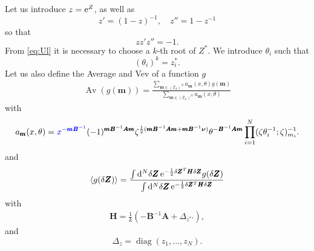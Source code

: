 \documentclass[a4paper,11pt]{article}	%
\DeclareMathOperator{\diag}{diag}
\newcommand{\bs}[1]{\boldsymbol{#1}}
\def\IZ{\mathbb{Z}}
\def\vev#1{\left\langle #1 \right\rangle}
\newcommand{\re}{{\rm e}}
\newcommand{\rd}{{\rm d}}
\begin{document}
Let us introduce $z = \re^{Z}$, as well as
\begin{equation}
  z' = (1-z)^{-1},\quad z'' = 1-z^{-1}
\end{equation}
so that
\begin{equation}
  z z' z'' = -1.
\end{equation}
%
From \eqref{eq:Ul} it is necessary to choose a $k$-th
root of $Z^*$. We introduce $\theta_i$ such that
\begin{equation}
  (\theta_i)^k = z_i^*.
\end{equation}
%
%
Let us also define the Average and Vev of a function $g$
\begin{align}
  \mathop{\text{Av}}(g(\pmb{m})) =
  \frac{\sum_{\pmb{m}\in(\IZ_k)^N} a_{\pmb{m}}(x,\theta) g(\pmb{m})}
  {\sum_{\pmb{m}\in(\IZ_k)^N} a_{\pmb{m}}(x,\theta)}
\end{align}
with
\begin{align}
  a_{\pmb{m}}(x,\theta) =
  \textcolor{blue}{x^{-\pmb{m}\pmb{B}^{-1}}}
  (-1)^{\pmb{m}\pmb{B}^{-1}\pmb{A}\pmb{m}}
  \zeta^{\frac{1}{2}(\pmb{m}\pmb{B}^{-1}\pmb{A}\pmb{m}+\pmb{m}\pmb{B}^{-1}\bs\nu)}
  \theta^{-\pmb{B}^{-1}\pmb{A}\pmb{m}}
  \prod_{i=1}^N(\zeta\theta_i^{-1};\zeta)_{m_i}^{-1}.
  \label{eq:am}
\end{align}
and
\begin{align}
  \vev{g(\delta \pmb{Z})} = \frac{\int \rd^N \delta \pmb{Z}\,
  \re^{-\frac{1}{2}\delta \pmb{Z}^T \pmb{H} \delta \pmb{Z}}g(\delta \pmb{Z})}
  {\int\rd^N \delta \pmb{Z}\,
  \re^{-\frac{1}{2}\delta \pmb{Z}^T \pmb{H} \delta \pmb{Z}}}
\end{align}
with
\begin{align}
  \pmb{H} = \frac{1}{k}\left(-\pmb{B}^{-1}\pmb{A} + \Delta_{{z^*}'}\right),
\end{align}
and
\begin{equation}
  \Delta_z = \diag(z_1,\ldots,z_N).
\end{equation}
\end{document}
